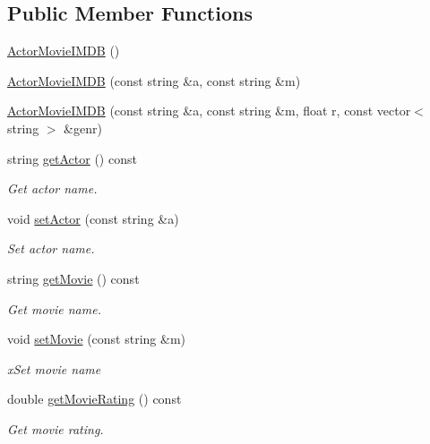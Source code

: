 \subsection*{Public Member Functions}
\begin{DoxyCompactItemize}
\item 
\mbox{\hyperlink{classbridges_1_1dataset_1_1_actor_movie_i_m_d_b_a2dd3c778f60e453f1eb4eebae1b9cf69}{Actor\+Movie\+I\+M\+DB}} ()
\item 
\mbox{\hyperlink{classbridges_1_1dataset_1_1_actor_movie_i_m_d_b_ad25093094e26944f748c83f0cd7d3b7c}{Actor\+Movie\+I\+M\+DB}} (const string \&a, const string \&m)
\item 
\mbox{\hyperlink{classbridges_1_1dataset_1_1_actor_movie_i_m_d_b_acb8ea0cb67e8f9d224ed3f937ac91c7c}{Actor\+Movie\+I\+M\+DB}} (const string \&a, const string \&m, float r, const vector$<$ string $>$ \&genr)
\item 
string \mbox{\hyperlink{classbridges_1_1dataset_1_1_actor_movie_i_m_d_b_ad3b1e7cd85824826423153fd967e00b0}{get\+Actor}} () const
\begin{DoxyCompactList}\small\item\em Get actor name. \end{DoxyCompactList}\item 
void \mbox{\hyperlink{classbridges_1_1dataset_1_1_actor_movie_i_m_d_b_a1782413bd11c84384ca0eeb718eaa19f}{set\+Actor}} (const string \&a)
\begin{DoxyCompactList}\small\item\em Set actor name. \end{DoxyCompactList}\item 
string \mbox{\hyperlink{classbridges_1_1dataset_1_1_actor_movie_i_m_d_b_aaa204209dfe7ed6173a1a39e8cfcdbc7}{get\+Movie}} () const
\begin{DoxyCompactList}\small\item\em Get movie name. \end{DoxyCompactList}\item 
void \mbox{\hyperlink{classbridges_1_1dataset_1_1_actor_movie_i_m_d_b_adc95ee7566046ae60aedad96868d3ae4}{set\+Movie}} (const string \&m)
\begin{DoxyCompactList}\small\item\em x\+Set movie name \end{DoxyCompactList}\item 
double \mbox{\hyperlink{classbridges_1_1dataset_1_1_actor_movie_i_m_d_b_adf129339ae6aca66053774b95ff20937}{get\+Movie\+Rating}} () const
\begin{DoxyCompactList}\small\item\em Get movie rating. \end{DoxyCompactList}\item 

\end{DoxyCompactItemize}
